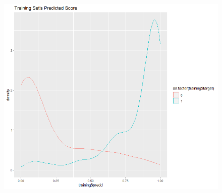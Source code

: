 \documentclass{article}
\begin{document}
\begin{figure}[H]
  \centering
  \includegraphics[width=1\textwidth]{1_1_trainScore.png}
\end{figure}
\end{document}
